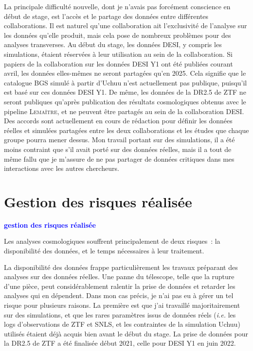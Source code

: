 \documentclass{book}
\newcommand{\consignes}[1]{{\textcolor{blue}{\bf \large #1}}}
\def\lemaitre{\textsc{Lemaître}\xspace}
\begin{document}
La principale difficulté nouvelle, dont je n'avais pas forcément conscience en début de stage, est l'accès et le partage des données entre différentes collaborations. Il est naturel qu'une collaboration ait l'exclusivité de l'analyse sur les données qu'elle produit, mais cela pose de nombreux problèmes pour des analyses transverses. Au début du stage, les données DESI, y compris les simulations, étaient réservées à leur utilisation au sein de la collaboration. Si papiers de la collaboration sur les données DESI Y1 ont été publiées courant avril, les données elles-mêmes ne seront partagées qu'en 2025. Cela signifie que le catalogue BGS simulé à partir d'Uchuu n'est actuellement pas publique, puisqu'il est basé sur ces données DESI Y1. De même, les données de la DR2.5 de ZTF ne seront publiques qu'après publication des résultats cosmologiques obtenus avec le pipeline \lemaitre, et ne peuvent être partagés au sein de la collaboration DESI. Des accords sont actuellement en cours de rédaction pour définir les données réelles et simulées partagées entre les deux collaborations et les études que chaque groupe pourra mener dessus. Mon travail portant sur des simulations, il a été moins contraint que s'il avait porté sur des données réelles, mais il a tout de même fallu que je m'assure de ne pas partager de données critiques dans mes interactions avec les autres chercheurs.


\section{Gestion des risques réalisée}
\consignes{gestion des risques réalisée}

Les analyses cosmologiques souffrent principalement de deux risques~: la disponibilité des données, et le temps nécessaires à leur traitement.

La disponibilité des données frappe particulièrement les travaux préparant des analyses sur des données réelles. Une panne du télescope, telle que la rupture d'une pièce, peut considérablement ralentir la prise de données et retarder les analyses qui en dépendent. Dans mon cas précis, je n'ai pas eu à gérer un tel risque pour plusieurs raisons. La première est que j'ai travaillé majoritairement sur des simulations, et que les rares paramètres issus de données réels (\textit{i.e.} les logs d'observations de ZTF et SNLS, et les contraintes de la simulation Uchuu) utilisés étaient déjà acquis bien avant le début du stage. La prise de données pour la DR2.5 de ZTF a été finalisée début 2021, celle pour DESI Y1 en juin 2022.
\end{document}
